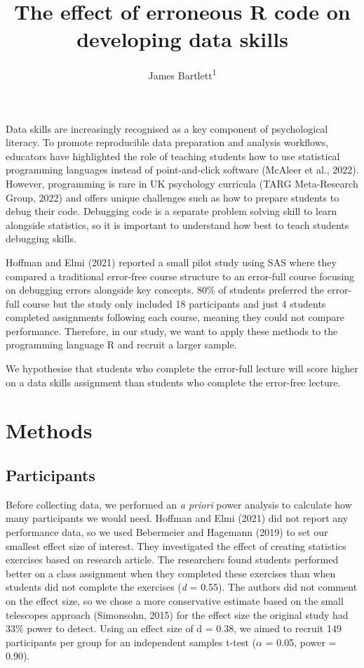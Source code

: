 \documentclass[
  man,floatsintext]{apa6}
\title{The effect of erroneous R code on developing data skills}
\author{James Bartlett\textsuperscript{1}}
\date{}
\affiliation{\vspace{0.5cm}\textsuperscript{1} University of Glasgow, United Kingdom}
\begin{document}
\maketitle

Data skills are increasingly recognised as a key component of psychological literacy. To promote reproducible data preparation and analysis workflows, educators have highlighted the role of teaching students how to use statistical programming languages instead of point-and-click software (McAleer et al., 2022). However, programming is rare in UK psychology curricula (TARG Meta-Research Group, 2022) and offers unique challenges such as how to prepare students to debug their code. Debugging code is a separate problem solving skill to learn alongside statistics, so it is important to understand how best to teach students debugging skills.

Hoffman and Elmi (2021) reported a small pilot study using SAS where they compared a traditional error-free course structure to an error-full course focusing on debugging errors alongside key concepts. 80\% of students preferred the error-full course but the study only included 18 participants and just 4 students completed assignments following each course, meaning they could not compare performance. Therefore, in our study, we want to apply these methods to the programming language R and recruit a larger sample.

We hypothesise that students who complete the error-full lecture will score higher on a data skills assignment than students who complete the error-free lecture.

\hypertarget{methods}{%
\section{Methods}\label{methods}}

\hypertarget{participants}{%
\subsection{Participants}\label{participants}}

Before collecting data, we performed an \emph{a priori} power analysis to calculate how many participants we would need. Hoffman and Elmi (2021) did not report any performance data, so we used Bebermeier and Hagemann (2019) to set our smallest effect size of interest. They investigated the effect of creating statistics exercises based on research article. The researchers found students performed better on a class assignment when they completed these exercises than when students did not complete the exercises (\emph{d} = 0.55). The authors did not comment on the effect size, so we chose a more conservative estimate based on the small telescopes approach (Simonsohn, 2015) for the effect size the original study had 33\% power to detect. Using an effect size of d = 0.38, we aimed to recruit 149 participants per group for an independent samples t-test (\(\alpha\) = 0.05, power = 0.90).
\end{document}
